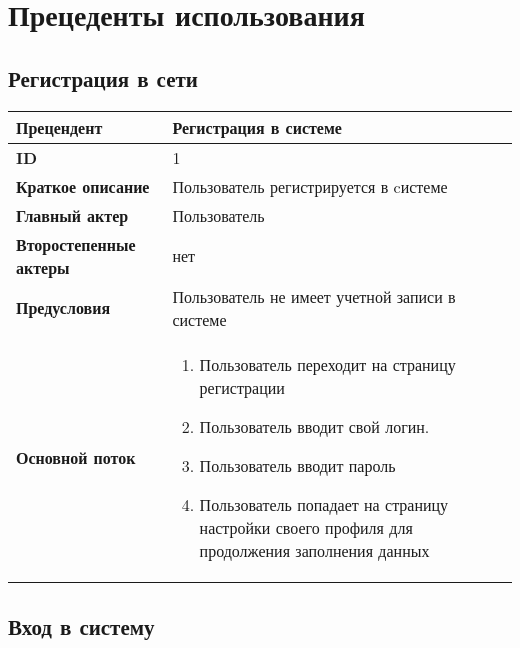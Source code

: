 \section{Прецеденты использования}
\subsection{Регистрация в сети}
\begin{tabular}{|l|p{9cm}|}
	\hline
	\textbf{Прецендент}            & Регистрация в системе                                                                             \\
	\hline
	\textbf{ID}                    & 1                                                                                                 \\
	\hline
	\textbf{Краткое описание}      & Пользователь регистрируется в cистеме                                                             \\
	\hline
	\textbf{Главный актер}         & Пользователь                                                                                      \\
	\hline
	\textbf{Второстепенные актеры} & нет                                                                                               \\
	\hline
	\textbf{Предусловия}           & Пользователь не имеет учетной записи в системе                                                    \\
	\hline
	\textbf{Основной поток}        & \begin{enumerate}
		                                 \item Пользователь переходит на страницу регистрации
		                                 \item Пользователь вводит свой логин.
		                                 \item Пользователь вводит пароль
		                                 \item Пользователь попадает на страницу настройки своего профиля для продолжения заполнения данных
	                                 \end{enumerate} \\
	\hline
\end{tabular}

\subsection{Вход в систему}

